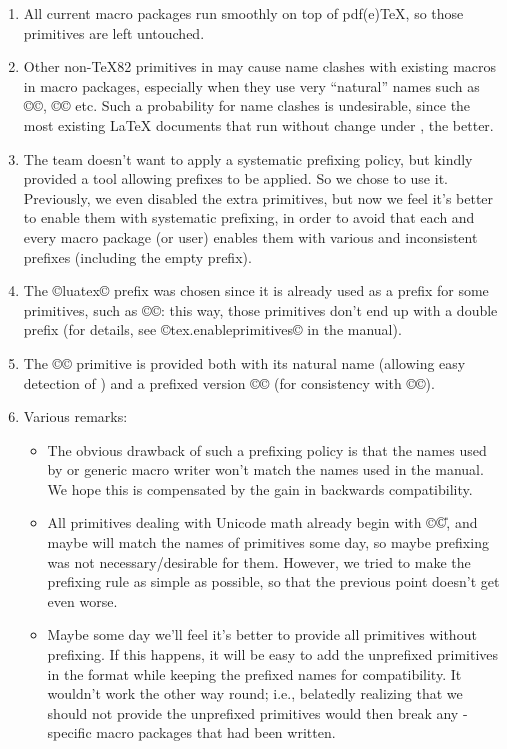 \documentclass{lltxdoc}
\begin{document}
\begin{myquote}
  \begin{enumerate}
    \item All current macro packages run smoothly on top of pdf(e)TeX, so
      those primitives are left untouched.
    \item Other non-TeX82 primitives in \luatex may cause name clashes with
      existing macros in macro packages, especially when they use very
      ``natural'' names such as ©\outputbox©, ©\mathstyle© etc. Such a
      probability for name clashes is undesirable, since the most existing
      LaTeX documents that run without change under \luatex, the better.
    \item The \luatex team doesn't want to apply a systematic prefixing policy,
      but kindly provided a tool allowing prefixes to be applied. So we chose
      to use it.  Previously, we even disabled the extra primitives, but now
      we feel it's better to enable them with systematic prefixing, in order
      to avoid that each and every macro package (or user) enables them with
      various and inconsistent prefixes (including the empty prefix).
    \item The ©luatex© prefix was chosen since it is already used as a prefix
      for some primitives, such as ©\luatexversion©: this way, those
      primitives don't end up with a double prefix (for details, see
      ©tex.enableprimitives© in the \luatex manual).
    \item The ©\directlua© primitive is provided both with its natural name
      (allowing easy detection of \luatex) and a prefixed version
      ©\luatexdirectlua© (for consistency with ©\luatexlatelua©).
    \item Various remarks:
      \begin{itemize}
        \item The obvious drawback of such a prefixing policy is that the
          names used by \latex or generic macro writer won't match the names
          used in the manual.  We hope this is compensated by the gain in
          backwards compatibility.
        \item All primitives dealing with Unicode math already begin with ©\U©,
          and maybe will match the names of \xetex primitives some day, so
          maybe prefixing was not necessary/desirable for them. However, we
          tried to make the prefixing rule as simple as possible, so that
          the previous point doesn't get even worse.
        \item Maybe some day we'll feel it's better to provide all primitives
          without prefixing. If this happens, it will be easy to add the
          unprefixed primitives in the format while keeping the prefixed names
          for compatibility. It wouldn't work the other way round; i.e.,
          belatedly realizing that we should not provide the unprefixed
          primitives would then break any \luatex-specific macro packages
          that had been written.
      \end{itemize}
  \end{enumerate}
\end{myquote}
\end{document}
